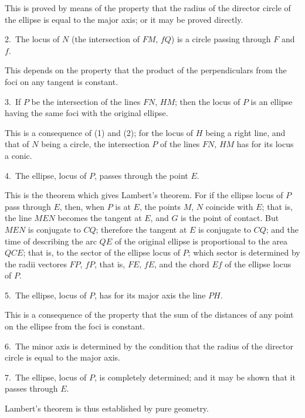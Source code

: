 \documentclass[11pt,a4paper]{book}
\providecommand{\mypar}{\par}
\begin{document}
\mypar
This is proved by means of the property that the radius of the director circle
of the ellipse is equal to the major axis; or it may be proved directly.

\mypar
2.~The locus of $N$ (the intersection of $FM$, $fQ$) is a circle passing
through $F$ and $f$.

\mypar
This depends on the property that the product of the perpendiculars from the
foci on any tangent is constant.

\mypar
3.~If $P$ be the intersection of the lines $FN$, $HM$; then the locus of $P$
is an ellipse having the same foci with the original ellipse.

\mypar
This is a consequence of (1) and (2); for the locus of $H$ being a right line,
and that of $N$ being a circle, the intersection $P$ of the lines $FN$, $HM$
has for its locus a conic.

\mypar
4.~The ellipse, locus of $P$, passes through the point $E$.

\mypar
This is the theorem which gives Lambert's theorem. For if the ellipse locus
of $P$ pass through $E$, then, when $P$ is at $E$, the points $M$, $N$ coincide
with $E$; that is, the line $MEN$ becomes the tangent at $E$, and $G$ is the
point of contact. But $MEN$ is conjugate to $CQ$; therefore the tangent at $E$
is conjugate to $CQ$; and the time of describing the arc $QE$ of the original
ellipse is proportional to the area $QCE$; that is, to the sector of the
ellipse locus of $P$; which sector is determined by the radii vectores $FP$,
$fP$, that is, $FE$, $fE$, and the chord $Ef$ of the ellipse locus of $P$.

\mypar
5.~The ellipse, locus of $P$, has for its major axis the line $PH$.

\mypar
This is a consequence of the property that the sum of the distances of any
point on the ellipse from the foci is constant.

\mypar
6.~The minor axis is determined by the condition that the radius of the
director circle is equal to the major axis.

\mypar
7.~The ellipse, locus of $P$, is completely determined; and it may be shown
that it passes through $E$.

\mypar
Lambert's theorem is thus established by pure geometry.

\clearpage

\end{document}
